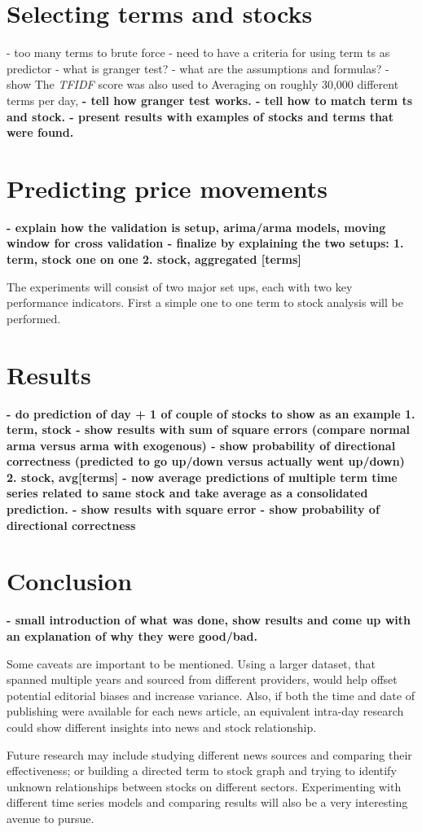 \documentclass{article}
\begin{document}
\section{Selecting terms and stocks}
- too many terms to brute force
- need to have a criteria for using term ts as predictor
- what is granger test?
- what are the assumptions and formulas?
\citep{Giles2011}
\citep{Toda1995}
- show 
The \textit{TFIDF} score was also used to 
Averaging on roughly 30,000 different terms per day,
\textbf{- tell how granger test works.
- tell how to match term ts and stock.
- present results with examples of stocks and terms that were found.}

\section{Predicting price movements}
\textbf{- explain how the validation is setup, arima/arma models, moving window for cross validation
- finalize by explaining the two setups:
  1. term, stock one on one
  2. stock, aggregated [terms]}
\par

The experiments will consist of two major set ups, each with two key performance indicators. First a simple one to one term to stock analysis will be performed.

\section{Results}
\textbf{- do prediction of day + 1 of couple of stocks to show as an example
1. term, stock
- show results with sum of square errors (compare normal arma versus arma with exogenous)
- show probability of directional correctness (predicted to go up/down versus actually went up/down)
2. stock, avg[terms]
- now average predictions of multiple term time series related to same stock and take average as a consolidated prediction.
- show results with square error
- show probability of directional correctness}


\section{Conclusion}
\textbf{- small introduction of what was done, show results and come up with an explanation of why they were good/bad.}
\par
Some caveats are important to be mentioned. Using a larger dataset, that spanned multiple years and sourced from different providers, would help offset potential editorial biases and increase variance. Also, if both the time and date of publishing were available for each news article, an equivalent intra-day research could show different insights into news and stock relationship.
\par
Future research may include studying different news sources and comparing their effectiveness; or building a directed term to stock graph and trying to identify unknown relationships between stocks on different sectors. Experimenting with different time series models and comparing results will also be a very interesting avenue to pursue.


\end{document}
